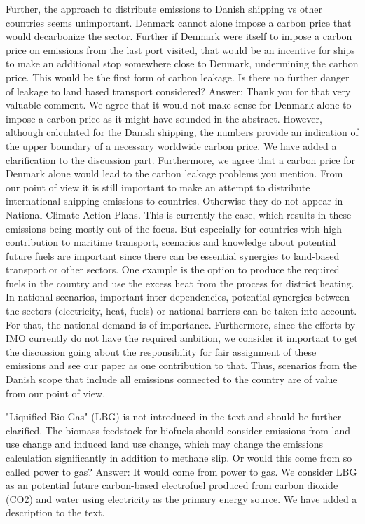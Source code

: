 Further, the approach to distribute emissions to Danish shipping vs other countries seems unimportant. Denmark cannot alone impose a carbon price that would decarbonize the sector. Further if Denmark were itself to impose a carbon price on emissions from the last port visited, that would be an incentive for ships to make an additional stop somewhere close to Denmark, undermining the carbon price. This would be the first form of carbon leakage. Is there no further danger of leakage to land based transport considered?
Answer: Thank you for that very valuable comment. We agree that it would not make sense for Denmark alone to impose a carbon price as it might have sounded in the abstract. However, although calculated for the Danish shipping, the numbers provide an indication of the upper boundary of a necessary worldwide carbon price. We have added a clarification to the discussion part.
Furthermore, we agree that a carbon price for Denmark alone would lead to the carbon leakage problems you mention. From our point of view it is still important to make an attempt to distribute international shipping emissions to countries. Otherwise they do not appear in National Climate Action Plans. This is currently the case, which results in these emissions being mostly out of the focus. But especially for countries with high contribution to maritime transport, scenarios and knowledge about potential future fuels are important since there can be essential synergies to land-based transport or other sectors. One example is the option to produce the required fuels in the country and use the excess heat from the process for district heating. In national scenarios, important inter-dependencies, potential synergies between the sectors (electricity, heat, fuels) or national barriers can be taken into account. For that, the national demand is of importance. Furthermore, since the efforts by IMO currently do not have the required ambition, we consider it important to get the discussion going about the responsibility for fair assignment of these emissions and see our paper as one contribution to that. Thus, scenarios from the Danish scope that include all emissions connected to the country are of value from our point of view.

"Liquified Bio Gas" (LBG) is not introduced in the text and should be further clarified. The biomass feedstock for biofuels should consider emissions from land use change and induced land use change, which may change the emissions calculation significantly in addition to methane slip. Or would this come from so called power to gas?
Answer: It would come from power to gas. We consider LBG as an potential future carbon-based electrofuel produced from carbon dioxide (CO2) and water using electricity as the primary energy source. We have added a description to the text.

